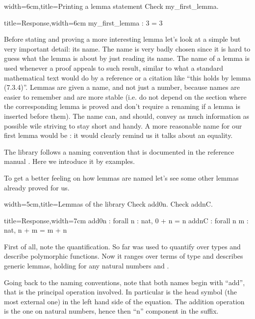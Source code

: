 \begin{coq}{width=6cm,title=Printing a lemma statement}
Check my_first_lemma.
\end{coq}
\begin{coqout}{title=Response,width=6cm}
my_first_lemma : 3 = 3
\end{coqout}

Before stating and proving a more interesting lemma let's look at a simple
but very important detail: its name.  The name is very badly chosen since
it is hard to guess what the lemma is about by just reading its name.
The name of a lemma is used whenever a proof appeals to such result,
similar to what a standard mathematical text would do by a reference or
a citation like ``this holds by lemma (7.3.4)''.  Lemmas are given a name,
and not just a number, because names are easier to remember and are more
stable (i.e. do not depend on the section where the corresponding lemma
is proved and don't require a renaming if a lemma is inserted before them).
The name can, and should, convey as much information as possible wile
striving to stay short and handy.  A more reasonable name for our
first lemma would be : it would clearly remind us it talks about
an equality.

The \mcbMC{} library follows a naming convention that is documented in
the reference manual \cite{xxx}.  Here we introduce it by examples.

To get a better feeling on how lemmas are named let's see some other
lemmas already proved for us.

\begin{coq}{width=5cm,title=Lemmas of the library}
Check add0n.
Check addnC.
\end{coq}
\begin{coqout}{title=Response,width=7cm}
add0n : forall n : nat, 0 + n = n
addnC : forall n m : nat, n + m = m + n
\end{coqout}

First of all, note the quantification. So far  was used to quantify
over types and describe polymorphic functions.  Now it ranges over terms of
type  and describes generic lemmas, holding for any natural numbers
 and .

Going back to the naming conventions, note that both names begin with ``add'',
that is the principal operation involved.  In particular is the head symbol
(the most external one) in the left hand side of the equation.  The addition
operation is the one on natural numbers, hence then ``n'' component in
the suffix.

